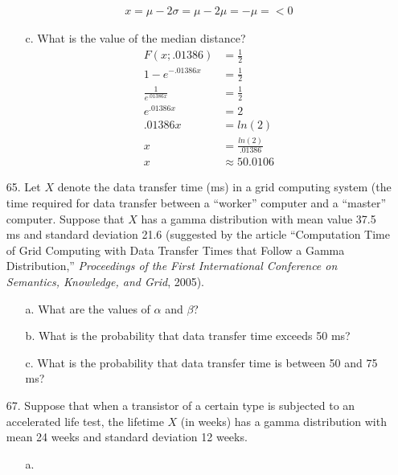 \documentclass[letterpaper,12pt]{article}
\begin{document}
\begin{enumerate}
\begin{enumerate}
        \begin{align*}
          x = \mu - 2\sigma = \mu - 2\mu = -\mu = < 0
        \end{align*}
      \item[c.]
        What is the value of the median distance?
        \begin{align*}
          F(x; .01386) &= \frac{1}{2} \\
          1 - e^{-.01386x} &= \frac{1}{2} \\
          \frac{1}{e^{.01386x}} &= \frac{1}{2} \\
          e^{.01386x} &= 2 \\
          .01386x &= ln(2) \\
          x &= \frac{ln(2)}{.01386} \\
          x &\approx 50.0106
        \end{align*}
    \end{enumerate}
  \item[65.]
    Let $X$ denote the data transfer time (ms) in a grid computing system (the time required for data transfer between a ``worker'' computer and a ``master'' computer. Suppose that $X$ has a gamma distribution with mean value 37.5 ms and standard deviation 21.6 (suggested by the article ``Computation Time of Grid Computing with Data Transfer Times that Follow a Gamma Distribution,'' \textit{Proceedings of the First International Conference on Semantics, Knowledge, and Grid}, 2005).
    \begin{enumerate}
      \item[a.]
        What are the values of $\alpha$ and $\beta$?
      \item[b.]
        What is the probability that data transfer time exceeds 50 ms?
      \item[c.]
        What is the probability that data transfer time is between 50 and 75 ms?
    \end{enumerate}
  \item[67.]
    Suppose that when a transistor of a certain type is subjected to an accelerated life test, the lifetime $X$ (in weeks) has a gamma distribution with mean 24 weeks and standard deviation 12 weeks.
    \begin{enumerate}
      \item[a.]

\end{enumerate}
\end{enumerate}
\end{document}
